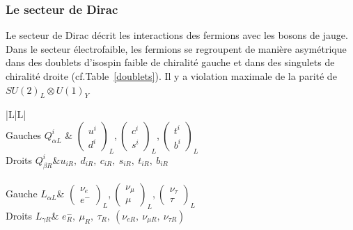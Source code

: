 \subsubsection{Le secteur de Dirac}
Le secteur de Dirac décrit les interactions des fermions avec les bosons de jauge. Dans le secteur électrofaible, les fermions se regroupent de manière asymétrique dans des doublets d'isospin faible de chiralité gauche et dans des singulets de chiralité droite (cf.Table~\ref{doublets}). Il y a violation maximale de la parité de $SU(2)_{L}\otimes U(1)_{Y}$

\begin{table}[H]
	\centering
	\begin{tabular}{|L|L|} 
	\hline
	 \\
	\hline
	Gauches $Q_{\alpha L}^{i}$ & $
	\left(\begin{matrix} 
	 u^{i}\\
	 d^{i} 
	\end{matrix}\right)_{L}$,$\ 
	\left(\begin{matrix} 
	 c^{i}\\
	 s^{i}
	\end{matrix}\right)_{L}$,$\ 
	\left(\begin{matrix} 
	 t^{i}\\
	 b^{i}
	\end{matrix}\right)_{L}$ \\
	\hline
	Droits $Q_{\beta R}^{i}$&$ u_{iR},\ d_{iR},\ c_{iR},\ s_{iR},\ t_{iR},\ b_{iR}$\\
	\hline
	\rowcolor{Green2}\multicolumn{2}{|Cc|}{Leptons} \\
	\hline
	Gauche $L_{\alpha L}$& $
	\left(\begin{matrix} 
	\nu_{e}\\
	 e^{-}
	\end{matrix}\right)_{L}$,$\ 
	\left(\begin{matrix} 
	\nu_{\mu}\\
	\mu
	\end{matrix}\right)_{L}$,$\ 
	\left(\begin{matrix} 
	\nu_{\tau}\\
	\tau
	\end{matrix}\right)_{L} $\\
	\hline
	Droits $L_{\gamma R}$& $e^{-}_{R},\ \mu_{R},\ \tau_{R},\ \left(\nu_{e R},\ \nu_{\mu R},\ \nu_{\tau R}\right)$ \\
	\hline
\end{tabular}
\label{doublets}
\end{table}	

